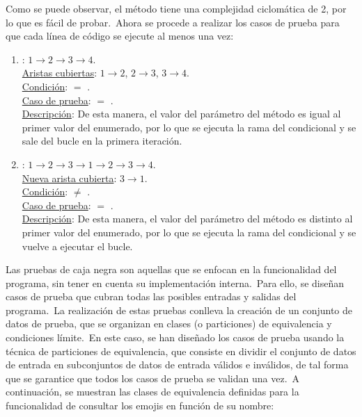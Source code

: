 Como se puede observar, el método tiene una complejidad ciclomática de 2, por lo que es fácil de probar.\ Ahora se
procede a realizar los casos de prueba para que cada línea de código se ejecute al menos una vez:

\begin{enumerate}
	\item {}: $1 \rightarrow 2 \rightarrow 3 \rightarrow 4$.
	\\
	\underline{Aristas cubiertas}: $1 \rightarrow 2$, $2 \rightarrow 3$, $3 \rightarrow 4$.\\
	\underline{Condición}:  $=$ .\\
	\underline{Caso de prueba}:  $=$ .\\
	\underline{Descripción}:
	De esta manera, el valor del parámetro del método es igual al primer valor del enumerado,
	por lo que se ejecuta la rama  del condicional y se sale del bucle en la primera iteración.

	\item {}: $1 \rightarrow 2 \rightarrow 3 \rightarrow 1 \rightarrow 2 \rightarrow 3 \rightarrow 4$.
	\\
	\underline{Nueva arista cubierta}: $3 \rightarrow 1$.\\
	\underline{Condición}:  $\neq$ .\\
	\underline{Caso de prueba}:  $=$ .\\
	\underline{Descripción}:
	De esta manera, el valor del parámetro del método es distinto al primer valor del
	enumerado, por lo que se ejecuta la rama  del condicional y se vuelve a ejecutar el bucle.
\end{enumerate}
\label{itm:casos-prueba-pruebas-unitarias-caja-blanca}


Las pruebas de caja negra son aquellas que se enfocan en la funcionalidad del programa, sin tener en cuenta su
implementación interna.\ Para ello, se diseñan casos de prueba que cubran todas las posibles entradas y salidas
del programa.\ La realización de estas pruebas conlleva la creación de un conjunto de datos de prueba, que se
organizan en clases (o particiones) de equivalencia y condiciones límite.\ En este caso, se han diseñado los casos de
prueba usando la técnica de particiones de equivalencia, que consiste en dividir el conjunto de datos de entrada en
subconjuntos de datos de entrada válidos e inválidos, de tal forma que se garantice que todos los casos de prueba
se validan una vez.\ A continuación, se muestran las clases de equivalencia definidas para la funcionalidad de
consultar los emojis en función de su nombre:


